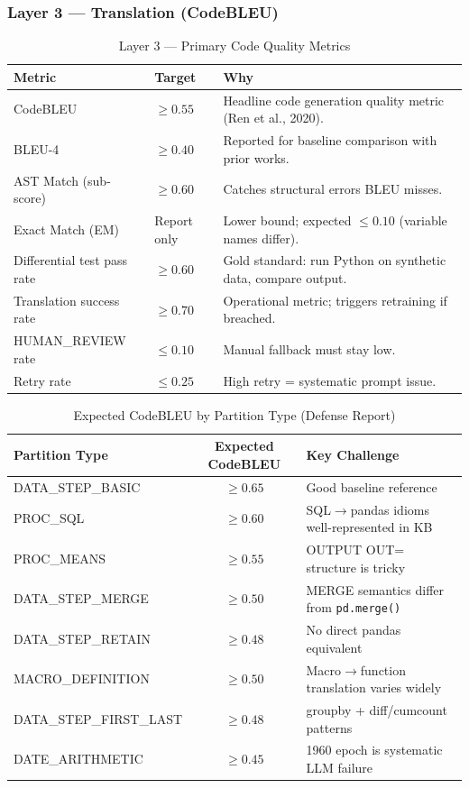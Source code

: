\documentclass[11pt,a4paper]{article}
\begin{document}
\subsubsection{Layer 3 — Translation (CodeBLEU)}

\begin{table}[H]
\centering
\caption{Layer 3 — Primary Code Quality Metrics}
\renewcommand{\arraystretch}{1.25}
\small
\begin{tabularx}{\textwidth}{@{} L{3.5cm} l X @{}}
\toprule
\textbf{Metric} & \textbf{Target} & \textbf{Why} \\
\midrule
CodeBLEU & $\geq 0.55$ & Headline code generation quality metric (Ren et al., 2020). \\
BLEU-4 & $\geq 0.40$ & Reported for baseline comparison with prior works. \\
AST Match (sub-score) & $\geq 0.60$ & Catches structural errors BLEU misses. \\
Exact Match (EM) & Report only & Lower bound; expected $\leq 0.10$ (variable names differ). \\
Differential test pass rate & $\geq 0.60$ & Gold standard: run Python on synthetic data, compare output. \\
Translation success rate & $\geq 0.70$ & Operational metric; triggers retraining if breached. \\
HUMAN\_REVIEW rate & $\leq 0.10$ & Manual fallback must stay low. \\
Retry rate & $\leq 0.25$ & High retry = systematic prompt issue. \\
\bottomrule
\end{tabularx}
\end{table}

\begin{table}[H]
\centering
\caption{Expected CodeBLEU by Partition Type (Defense Report)}
\renewcommand{\arraystretch}{1.2}
\small
\begin{tabularx}{\textwidth}{@{} l c X @{}}
\toprule
\textbf{Partition Type} & \textbf{Expected CodeBLEU} & \textbf{Key Challenge} \\
\midrule
DATA\_STEP\_BASIC & $\geq 0.65$ & Good baseline reference \\
PROC\_SQL & $\geq 0.60$ & SQL$\to$pandas idioms well-represented in KB \\
PROC\_MEANS & $\geq 0.55$ & OUTPUT OUT= structure is tricky \\
DATA\_STEP\_MERGE & $\geq 0.50$ & MERGE semantics differ from \texttt{pd.merge()} \\
DATA\_STEP\_RETAIN & $\geq 0.48$ & No direct pandas equivalent \\
MACRO\_DEFINITION & $\geq 0.50$ & Macro$\to$function translation varies widely \\
DATA\_STEP\_FIRST\_LAST & $\geq 0.48$ & groupby + diff/cumcount patterns \\
DATE\_ARITHMETIC & $\geq 0.45$ & 1960 epoch is systematic LLM failure \\
\bottomrule
\end{tabularx}
\end{table}
\end{document}
